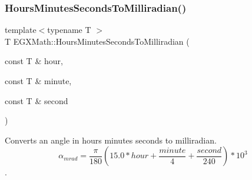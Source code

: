 \mbox{\label{group___e_g_x_math-_angle_conversions-_hours_minutes_seconds_gad78a90abaed52ca9d5fe6b4287c4a5f3}} 
\subsubsection{\texorpdfstring{Hours\+Minutes\+Seconds\+To\+Milliradian()}{HoursMinutesSecondsToMilliradian()}}
{\footnotesize\ttfamily template$<$typename T $>$ \\
T E\+G\+X\+Math\+::\+Hours\+Minutes\+Seconds\+To\+Milliradian (\begin{DoxyParamCaption}\item[{const T \&}]{hour,  }\item[{const T \&}]{minute,  }\item[{const T \&}]{second }\end{DoxyParamCaption})}



Converts an angle in hours minutes seconds to milliradian. \[\alpha_{mrad}=\frac{\pi}{180}(15.0 * hour + \frac{minute}{4} + \frac{second}{240})*10^3\]. 

